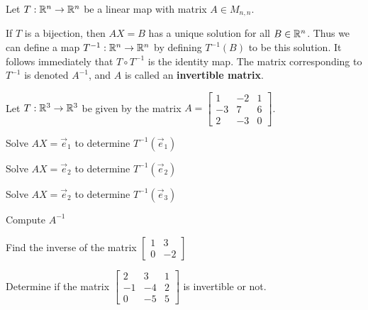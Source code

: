 
\begin{applicationActivities}{3}{23}

\begin{definition}
  Let $T: \mathbb{R}^n \rightarrow \mathbb{R}^n$ be a linear map with matrix $A \in M_{n,n}$.

  If $T$ is a bijection, then $AX=B$ has a unique solution for all $B \in \mathbb{R}^n$.  Thus we can define a map $T^{-1} : \mathbb{R}^n \rightarrow \mathbb{R}^n$ by defining $T^{-1}(B)$ to be this solution.  It follows immediately that $T \circ T^{-1}$ is the identity map.  The matrix corresponding to $T^{-1}$ is denoted $A^{-1}$, and $A$ is called an {\bf invertible matrix}.

\end{definition}
\begin{activity}{20}
Let $T: \mathbb{R}^3 \rightarrow \mathbb{R}^3$ be given by the matrix $A=\begin{bmatrix} 1 & -2 & 1 \\ -3 & 7 & 6 \\ 2 & -3 & 0 \end{bmatrix}$.
  \begin{subactivity}
  Solve $AX=\vec{e}_1$ to determine $T^{-1}(\vec{e}_1)$
  \end{subactivity}
  \begin{subactivity}
   Solve $AX=\vec{e}_2$ to determine $T^{-1}(\vec{e}_2)$
  \end{subactivity}
  \begin{subactivity}
   Solve $AX=\vec{e}_2$ to determine $T^{-1}(\vec{e}_3)$
  \end{subactivity}
  \begin{subactivity}
  Compute $A^{-1}$
  \end{subactivity}
\end{activity}

\begin{activity}{15}
  Find the inverse of the matrix $\begin{bmatrix} 1 & 3 \\ 0 & -2 \end{bmatrix}$
\end{activity}

\begin{activity}{15}
Determine if the matrix $\begin{bmatrix} 2 & 3 & 1 \\ -1 & -4 & 2 \\ 0 & -5 & 5 \end{bmatrix}$ is invertible or not.
\end{activity}

\end{applicationActivities}
